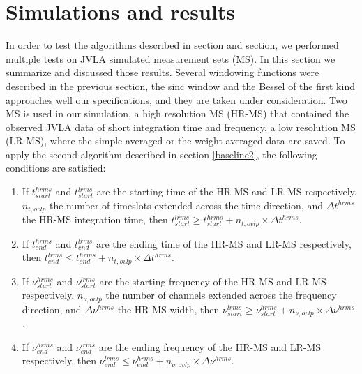 \documentclass[useAMS,usenatbib]{mn2e}
\begin{document}
\section{Simulations and results}
In order to test the algorithms described in section and section, we performed  multiple tests on JVLA simulated measurement sets (MS). In 
this section we summarize and discussed those results. Several windowing functions  were described in the previous
section, the sinc window 
and the Bessel of the first kind approaches well our specifications, and they are taken under consideration. Two MS is used in 
our simulation, a high resolution MS (HR-MS) that contained the observed JVLA data of short integration time and frequency, a low resolution 
MS (LR-MS), where the simple averaged or the weight averaged data are saved. To apply the second algorithm described in section 
\ref{baseline2}, the following conditions are satisfied:
\begin{enumerate}
 \item If $t^{hrms}_{start}$ and $t^{lrms}_{start}$ are the starting time of the HR-MS and LR-MS respectively. $n_{t,ovlp}$ the number 
of timeslots extended across the time direction, and  $\Delta t^{hrms}$ the HR-MS integration time, then 
	    $t^{lrms}_{start}\geq t^{hrms}_{start} + n_{t,ovlp}\times \Delta t^{hrms}$. 
  \item If $t^{hrms}_{end}$ and $t^{lrms}_{end}$ are the ending time of the HR-MS and LR-MS respectively, then 
	    $t^{lrms}_{end}\leq t^{hrms}_{end} + n_{t,ovlp}\times \Delta t^{hrms}$. 
 \item If $\nu^{hrms}_{start}$ and $\nu^{lrms}_{start}$ are the starting frequency of the HR-MS and LR-MS respectively. $n_{\nu,ovlp}$ 
the number of channels extended across the frequency direction, and  $\Delta \nu^{hrms}$ the HR-MS width, then 
	    $\nu^{lrms}_{start} \geq \nu^{hrms}_{start} + n_{\nu,ovlp}\times \Delta \nu^{hrms}$. 
 \item If $\nu^{hrms}_{end}$ and $\nu^{lrms}_{end}$ are the ending frequency of the HR-MS and LR-MS respectively, then 
	    $\nu^{lrms}_{end} \leq \nu^{hrms}_{end} + n_{\nu,ovlp}\times \Delta \nu^{hrms}$. 
\end{enumerate}
\end{document}
